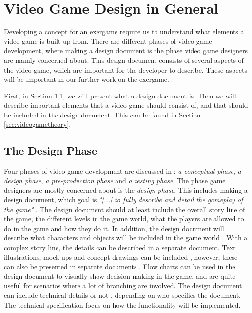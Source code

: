 \chapter{Video Game Design in General} 
\label{chap:vg}
Developing a concept for an exergame require us to understand what elements a video game is built up from. There are different phases of video game development, where making a design document is the phase video game designers are mainly concerned about. This design document consists of several aspects of the video game, which are important for the developer to describe. These aspects will be important in our further work on the exergame.

First, in Section \ref{sec:designphase}, we will present what a design document is. Then we will describe important elements that a video game should consist of, and that should be included in the design document.  This can be found in Section \ref{sec:videogametheory}.

\section{The Design Phase}
\label{sec:designphase}
Four phases of video game development are discussed in \cite{understandingvg}: \emph{a conceptual phase}, \emph{a design phase}, \emph{a pre-production phase} and \emph{a testing phase}. The phase game designers are mostly concerned about is the \emph{design phase}. This includes making a design document, which goal is \emph{"[...] to fully describe and detail the gameplay of the game"} \cite{gamedesign}. The design document should at least include the overall story line of the game, the different levels in the game world, what the players are allowed to do in the game and how they do it. In addition, the design document will describe what characters and objects will be included in the game world \cite{gamedesign}. With a complex story line, the details can be described in a separate document. Text illustrations, mock-ups and concept drawings can be included \cite{understandingvg}, however, these can also be presented in separate documents \cite{gamedesign}. Flow charts can be used in the design document to visually show decision making in the game, and are quite useful for scenarios where a lot of branching are involved. The design document can include technical details \cite{understandingvg} or not \cite{gamedesign}, depending on who specifies the document. The technical specification focus on how the functionality will be implemented. 

